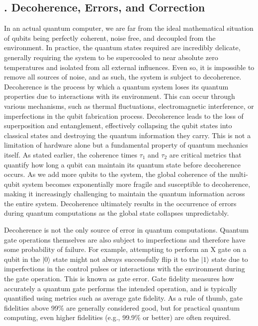 \documentclass{elbioimp2}
\begin{document}
\subsection{. Decoherence, Errors, and Correction}
In an actual quantum computer, we are far from the ideal mathematical situation of qubits being perfectly coherent, noise free, and decoupled from the environment. In practice, the quantum states required are incredibly delicate, generally requiring the system to be supercooled to near absolute zero temperatures and isolated from all external influences. Even so, it is impossible to remove all sources of noise, and as such, the system is subject to decoherence. Decoherence is the process by which a quantum system loses its quantum properties due to interactions with its environment. This can occur through various mechanisms, such as thermal fluctuations, electromagnetic interference, or imperfections in the qubit fabrication process. Decoherence leads to the loss of superposition and entanglement, effectively collapsing the qubit states into classical states and destroying the quantum information they carry. This is not a limitation of hardware alone but a fundamental property of quantum mechanics itself. As stated earlier, the coherence times $\tau_1$ and $\tau_2$ are critical metrics that quantify how long a qubit can maintain its quantum state before decoherence occurs. As we add more qubits to the system, the global coherence of the multi-qubit system becomes exponentially more fragile and susceptible to decoherence, making it increasingly challenging to maintain the quantum information across the entire system. Decoherence ultimately results in the occurrence of errors during quantum computations as the global state collapses unpredictably.

Decoherence is not the only source of error in quantum computations. Quantum gate operations themselves are also subject to imperfections and therefore have some probability of failure. For example, attempting to perform an X gate on a qubit in the $|0\rangle$ state might not always successfully flip it to the $|1\rangle$ state due to imperfections in the control pulses or interactions with the environment during the gate operation. This is known as gate error. Gate fidelity measures how accurately a quantum gate performs the intended operation, and is typically quantified using metrics such as average gate fidelity. As a rule of thumb, gate fidelities above 99\% are generally considered good, but for practical quantum computing, even higher fidelities (e.g., 99.9\% or better) are often required.
\end{document}
